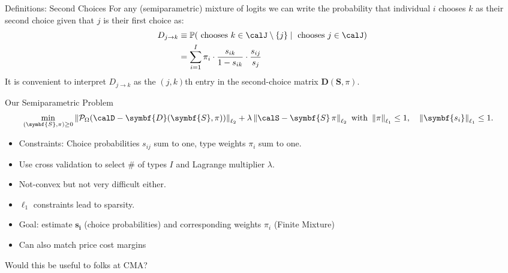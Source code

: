 \begin{frame}{Definitions: Second Choices}
For any (semiparametric) mixture of logits we can write the probability that individual $i$ chooses $k$ as their \alert{second choice} given that $j$ is their first choice as:
\begin{align*}
D_{j \rightarrow k} & \equiv \mathbb{P}(\text{ chooses } k \in \calJ \setminus \{j\} \mid
\text{ chooses } j \in \calJ )\\
&= \sum_{i=1}^I \pi_i \cdot \frac{s_{ik}}{1-s_{ik}} \cdot \frac{s_{ij}}{s_j}
\end{align*}
It is convenient to interpret $D_{j \rightarrow k}$ as the $(j,k)$th entry in the second-choice matrix $\symbf{D}(\symbf{S},\pi)$.
\end{frame}




\begin{frame}{Our Semiparametric Problem}
\small
\begin{align*}
\min _{(\symbf{S}, \pi) \geq 0} \left\|\mathcal{P}_{\Omega}(\calD-\symbf{D}(\symbf{S},\pi))\right\|_{\ell_2}  &+ \lambda \left\|\calS- \symbf{S}\,\pi \right\|_{\ell_2} \text { with } \left\|\pi  \right\|_{\ell_1} \leq 1, \quad   \left\|\symbf{s_i}  \right\|_{\ell_1} \leq 1.
\end{align*}
\vspace{-.25cm}
\begin{itemize}
    \item Constraints: Choice probabilities $s_{ij}$ sum to one, type weights $\pi_i$ sum to one.
\item Use cross validation to select \# of types $I$ and Lagrange multiplier $\lambda$.
\item Not-convex but not very difficult either.
\item $\ell_1$ constraints lead to \alert{sparsity}.
\item Goal: estimate $\symbf{s_i}$ (choice probabilities) and corresponding weights $\pi_i$ (Finite Mixture)
\item Can also match \alert{price cost margins}
\end{itemize}
Would this be useful to folks at CMA?
\end{frame}



